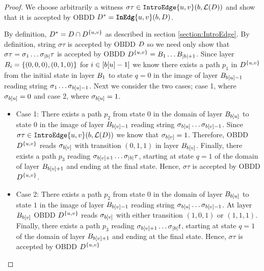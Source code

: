 \begin{proof}
    We choose arbitrarily a  witness $\sigma\tau \in \texttt{IntroEdge}\{u,v\}(b,\mathcal{L}(D))$ and show that it is accepted by OBDD $D^* = \texttt{\textbf{InEdg}}\{u,v\}(b,D)$.

    By definition, $D^* = D \cap D^{\{u,v\}}$ as described in section \ref{section:IntroEdge}. By definition, string $\sigma\tau$ is accepted by OBDD $D$ so we need only show that $\sigma\tau = \sigma_1\dots \sigma_{|b|}\tau$ is accepted by OBDD $D^{\{u,v\}} = B_1\dots B_{|b|+1}$. Since layer $B_i = \{(0,0,0), (0,1,0)\}$ for $i \in [b[u]-1]$ we know there exists a path $p_1$ in $D^{\{u,v\}}$ from the initial state in layer $B_1$ to state $q = 0$ in the image of layer $B_{b[u]-1}$ reading string $\sigma_1\dots \sigma_{b[u]-1}$. Next we consider the two cases; case 1, where $\sigma_{b[u]} = 0$ and case 2, where $\sigma_{b[u]} = 1$.

    \begin{itemize}
        \item Case 1: There exists a path $p_2$ from state $0$ in the domain of layer $B_{b[u]}$ to state $0$ in the image of layer $B_{b[v]-1}$ reading string $\sigma_{b[u]}\dots \sigma_{b[v]-1}$. Since $\sigma\tau \in \texttt{IntroEdge}\{u,v\}(b,\mathcal{L}(D))$ we know that $\sigma_{b[v]} = 1$. Therefore, OBDD $D^{\{u,v\}}$ reads $\sigma_{b[v]}$ with transition $(0,1,1)$ in layer $B_{b[v]}$. Finally, there exists a path $p_3$ reading $\sigma_{b[v] + 1}\dots \sigma_{|b|}\tau$, starting at state $q=1$ of the domain of layer $B_{b[v] + 1}$ and ending at the final state. Hence, $\sigma\tau$ is accepted by OBDD $D^{\{u,v\}}$.
        
        \item Case 2: There exists a path $p_2$ from state $0$ in the domain of layer $B_{b[u]}$ to state $1$ in the image of layer $B_{b[v]-1}$ reading string $\sigma_{b[u]}\dots \sigma_{b[v]-1}$. At layer $B_{b[v]}$ OBDD $D^{\{u,v\}}$ reads $\sigma_{b[v]}$ with either transition $(1,0,1)$ or $(1,1,1)$. Finally, there exists a path $p_3$ reading  $\sigma_{b[v] + 1}\dots \sigma_{|b|}t$, starting at state $q=1$ of the domain of layer $B_{b[v] + 1}$ and ending at the final state. Hence, $\sigma\tau$ is accepted by OBDD $D^{\{u,v\}}$
    \end{itemize}


\end{proof}
